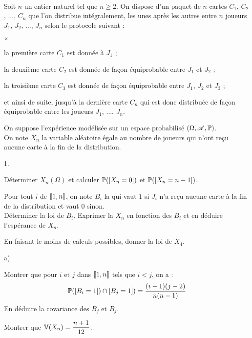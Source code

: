 \documentclass[11pt]{article}%
\begin{document}
\newpage


\begin{exercice}~\\ %
 Soit $n$ un entier naturel tel que $n\geq 2$. On dispose d'un paquet 
de $n$ cartes $C_1$, $C_2$, $\hdots$, $C_n$ que l'on distribue 
intégralement, les unes après les autres entre $n$ joueurs $J_1$, 
$J_2$, $\hdots$, $J_n$ selon le protocole suivant :
\begin{noliste}{$\scriptstyle \times$}
 \item la première carte $C_1$ est donnée à $J_1$ ;
 \item la deuxième carte $C_2$ est donnée de façon équiprobable entre 
$J_1$ et $J_2$ ;
 \item la troisième carte $C_3$ est donnée de façon équiprobable entre 
$J_1$, $J_2$ et $J_3$ ;
 \item et ainsi de suite, jusqu'à la dernière carte $C_n$ qui est donc 
distribuée de façon équiprobable entre les joueurs $J_1$, $\hdots$, 
$J_n$.
\end{noliste}
On suppose l'expérience modélisée sur un espace probabilisé $(\Omega, 
\mathscr{A}, \mathbb{P})$.\\
On note $X_n$ la variable aléatoire égale au nombre de joueurs qui 
n'ont reçu aucune carte à la fin de la distribution.
\begin{noliste}{1.}
 \item Déterminer $X_n(\Omega)$ et calculer $\mathbb{P}(\left[ {X_n=0} \right])$ et 
$\mathbb{P}(\left[ {X_n=n-1} \right])$.

 \item Pour tout $i$ de $\llbracket 1,n\rrbracket$, on note $B_i$ la \var qui vaut 
$1$ si $J_i$ n'a reçu aucune carte à la fin de la distribution et vaut 
$0$ sinon.\\
Déterminer la loi de $B_i$. Exprimer la \var $X_n$ en fonction des \var 
$B_i$ et en déduire l'espérance de $X_n$.

 \item En faisant le moins de calculs possibles, donner la loi de $X_4$.
 
 \item 
 \begin{noliste}{a)}
  \item Montrer que pour $i$ et $j$ dans $\llbracket 1,n\rrbracket$ tels que $i<j$, 
on a :
\[
 \mathbb{P}(\left[ {B_i=1} \right])\cap \left[ {B_j=1} \right])=\dfrac{(i-1)(j-2)}{n(n-1)}
\]
En déduire la covariance des \var $B_j$ et $B_j$.

  \item Montrer que $\mathbb{V}(X_n)=\dfrac{n+1}{12}$.
 \end{noliste}
\end{noliste}
\end{exercice}
\end{document}
